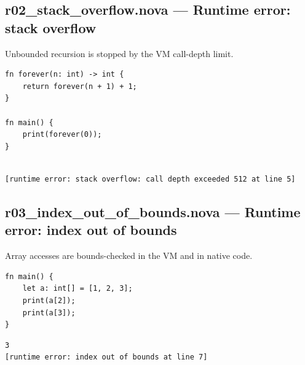 \subsection*{r02\_stack\_overflow.nova --- Runtime error: stack overflow}
\noindent Unbounded recursion is stopped by the VM call-depth limit.
\begin{lstlisting}[language=nova,]
fn forever(n: int) -> int {
    return forever(n + 1) + 1;
}

fn main() {
    print(forever(0));
}
\end{lstlisting}
\begin{tcolorbox}[colback=green!4,colframe=green!45!black,title={Program output (optimized VM)},fonttitle=\bfseries\small,boxsep=2pt,left=4pt,right=4pt,top=2pt,bottom=2pt]
\begin{lstlisting}[basicstyle=\ttfamily\scriptsize,frame=none,backgroundcolor=\color{white}]

[runtime error: stack overflow: call depth exceeded 512 at line 5]
\end{lstlisting}
\end{tcolorbox}
\subsection*{r03\_index\_out\_of\_bounds.nova --- Runtime error: index out of bounds}
\noindent Array accesses are bounds-checked in the VM and in native code.
\begin{lstlisting}[language=nova,]
fn main() {
    let a: int[] = [1, 2, 3];
    print(a[2]);
    print(a[3]);
}
\end{lstlisting}
\begin{tcolorbox}[colback=green!4,colframe=green!45!black,title={Program output (optimized VM)},fonttitle=\bfseries\small,boxsep=2pt,left=4pt,right=4pt,top=2pt,bottom=2pt]
\begin{lstlisting}[basicstyle=\ttfamily\scriptsize,frame=none,backgroundcolor=\color{white}]
3
[runtime error: index out of bounds at line 7]
\end{lstlisting}
\end{tcolorbox}
